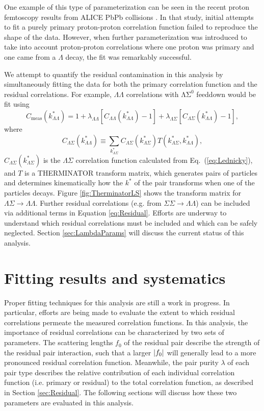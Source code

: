 One example of this type of parameterization can be seen in the recent proton femtoscopy results from ALICE PbPb collisions \cite{Szymanski:2012AN}.  In that study, initial attempts to fit a purely primary proton-proton correlation function failed to reproduce the shape of the data.  However, when further parameterization was introduced to take into account proton-proton correlations where one proton was primary and one came from a $\Lambda$ decay, the fit was remarkably successful.

We attempt to quantify the residual contamination in this analysis by simultaneously fitting the data for both the primary correlation function and the residual correlations.  For example, $\Lambda\Lambda$ correlations with $\mathrm{\Lambda\Sigma^0}$ feeddown would be fit using 
\begin{equation}
\label{eq:Residual}
C_{\mathrm{meas}}(k^*_{\Lambda\Lambda})= 1 + \lambda_{\Lambda\Lambda}[C_{\Lambda\Lambda}(k^*_{\Lambda\Lambda})-1]+\lambda_{\Lambda\Sigma}[C_{\Lambda\Sigma}(k^*_{\Lambda\Lambda})-1],
\end{equation}
where $$C_{\Lambda\Sigma}(k^*_{\Lambda\Lambda}) \equiv \displaystyle\sum\limits_{k^*_{\Lambda\Sigma}}C_{\Lambda\Sigma}(k^*_{\Lambda\Sigma})T(k^*_{\Lambda\Sigma},k^*_{\Lambda\Lambda}),$$ $C_{\Lambda\Sigma}(k^*_{\Lambda\Sigma})$ is the $\Lambda\Sigma$ correlation function calculated from Eq.~(\ref{eq:Lednicky}), and $T$ is a THERMINATOR \cite{Chojnacki:2011hb} transform matrix, which generates pairs of particles and determines kinematically how the $k^*$ of the pair transforms when one of the particles decays.  Figure \ref{fig:TherminatorLS} shows the transform matrix for $\Lambda\Sigma \rightarrow \Lambda\Lambda$.  Further residual correlations (e.g. from $\Sigma\Sigma \rightarrow \Lambda\Lambda$) can be included via additional terms in Equation \ref{eq:Residual}.  Efforts are underway to understand which residual correlations must be included and which can be safely neglected.  Section \ref{sec:LambdaParams} will discuss the current status of this analysis.

\section{Fitting results and systematics}
\label{sec:FittingSystematics}

Proper fitting techniques for this analysis are still a work in progress.  In particular, efforts are being made to evaluate the extent to which residual correlations permeate the measured correlation functions.  In this analysis, the importance of residual correlations can be characterized by two sets of parameters.  The scattering lengths $f_0$ of the residual pair describe the strength of the residual pair interaction, such that a larger $\left\lvert f_0\right\rvert$ will generally lead to a more pronounced residual correlation function.  Meanwhile, the pair purity $\lambda$ of each pair type describes the relative contribution of each individual correlation function (i.e. primary or residual) to the total correlation function, as described in Section \ref{sec:Residual}. The following sections will discuss how these two parameters are evaluated in this analysis.


